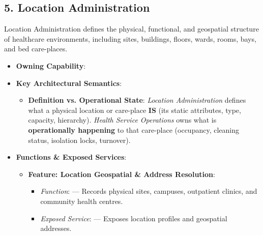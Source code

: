 \par\smallskip
{}\label{rad:em:136}
\subsection*{5. Location Administration}
\label{rad:em:138}

Location Administration defines the physical, functional, and geospatial structure of healthcare environments, including sites, buildings, floors, wards, rooms, bays, and bed care-places.

\label{rad:em:140}

\begin{itemize}

\item 
\textbf{Owning Capability}: \texttt{}



\item 
\textbf{Key Architectural Semantics}:


\begin{itemize}

\item 
\textbf{Definition vs. Operational State}: \emph{Location Administration} defines what a physical location or care-place \textbf{IS} (its static attributes, type, capacity, hierarchy). \emph{Health Service Operations} owns what is \textbf{operationally happening} to that care-place (occupancy, cleaning status, isolation locks, turnover).



\end{itemize}


\item 
\textbf{Functions \& Exposed Services}:


\begin{itemize}

\item 
\textbf{Feature: Location Geospatial \& Address Resolution}:


\begin{itemize}

\item 
\emph{Function}: \texttt{} — Records physical sites, campuses, outpatient clinics, and community health centres.



\item 
\emph{Exposed Service}: \texttt{} — Exposes location profiles and geospatial addresses.




\end{itemize}
\end{itemize}
\end{itemize}
